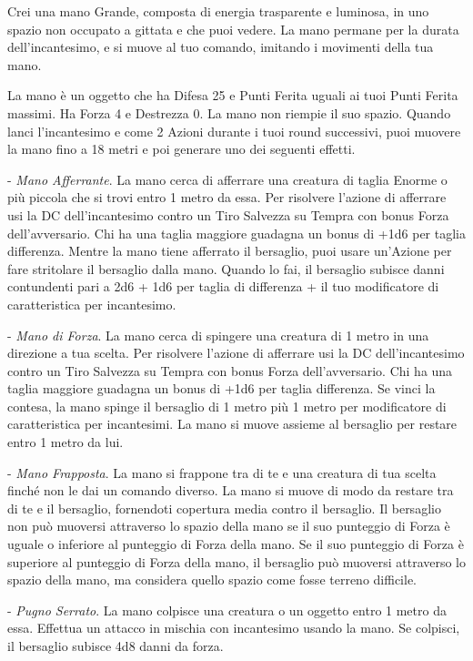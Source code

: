 \begin{multicols}{2}
Crei una mano Grande, composta di energia trasparente e luminosa, in uno spazio non occupato a gittata e che puoi vedere. La mano permane per la durata dell'incantesimo, e si muove al tuo comando, imitando i movimenti della tua mano.

La mano è un oggetto che ha Difesa 25 e Punti Ferita uguali ai tuoi Punti Ferita massimi. Ha Forza 4 e Destrezza 0. La mano non riempie il suo spazio.
Quando lanci l'incantesimo e come 2 Azioni durante i tuoi round successivi, puoi muovere la mano fino a 18 metri e poi generare uno dei seguenti effetti.

\medskip

- \emph{Mano Afferrante}. La mano cerca di afferrare una creatura di taglia Enorme o più piccola che si trovi entro 1 metro da essa. Per risolvere l'azione di afferrare usi la DC dell'incantesimo contro un Tiro Salvezza su Tempra con bonus Forza dell'avversario.
Chi ha una taglia maggiore guadagna un bonus di +1d6 per taglia differenza.
Mentre la mano tiene afferrato il bersaglio, puoi usare un'Azione per fare stritolare il bersaglio dalla mano. Quando lo fai, il bersaglio subisce danni contundenti pari a 2d6 + 1d6 per taglia di differenza + il tuo modificatore di caratteristica per incantesimo.

- \emph{Mano di Forza}. La mano cerca di spingere una creatura di 1 metro in una direzione a tua scelta. Per risolvere l'azione di afferrare usi la DC dell'incantesimo contro un Tiro Salvezza su Tempra con bonus Forza dell'avversario. Chi ha una taglia maggiore guadagna un bonus di +1d6 per taglia differenza.
Se vinci la contesa, la mano spinge il bersaglio di 1 metro più 1 metro per modificatore di caratteristica per incantesimi. La mano si muove assieme al bersaglio per restare entro 1 metro da lui.

- \emph{Mano Frapposta}. La mano si frappone tra di te e una creatura di tua scelta finché non le dai un comando diverso. La mano si muove di modo da restare tra di te e il bersaglio, fornendoti copertura media contro il bersaglio. Il bersaglio non può muoversi attraverso lo spazio della mano se il suo punteggio di Forza è uguale o inferiore al punteggio di Forza della mano. Se il suo punteggio di Forza è superiore al punteggio di Forza della mano, il bersaglio può muoversi attraverso lo spazio della mano, ma considera quello spazio come fosse terreno difficile.

- \emph{Pugno Serrato}. La mano colpisce una creatura o un oggetto entro 1 metro da essa. Effettua un attacco in mischia con incantesimo usando la mano. Se colpisci, il bersaglio subisce 4d8 danni da forza.


\end{multicols}
